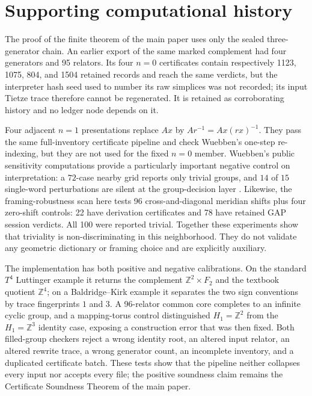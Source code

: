 \documentclass[11pt]{article}
\newcommand{\Z}{\mathbb{Z}}
\theoremstyle{definition}
\begin{document}
\section{Supporting computational history}\label{app:engineering}

The proof of the finite theorem of the main paper uses only the sealed three-generator
chain.  An earlier export of the same marked complement had four generators
and 95 relators.  Its four $n=0$ certificates contain respectively
1123, 1075, 804, and 1504 retained records and reach the same verdicts, but
the interpreter hash seed used to number its raw simplices was not recorded;
its input Tietze trace therefore cannot be regenerated.  It is retained as
corroborating history and no ledger node depends on it.

Four adjacent $n=1$ presentations replace $Ax$ by
$Ar^{-1}=Ax(rx)^{-1}$.  They pass the same full-inventory certificate
pipeline and check Wuebben's one-step re-indexing, but they are not used for
the fixed $n=0$ member.  Wuebben's public sensitivity computations provide a
particularly important negative control on interpretation: a $72$-case
nearby grid reports only trivial groups, and $14$ of $15$ single-word
perturbations are silent at the group-decision layer
\cite{WuebbenRepo}.  Likewise, the framing-robustness scan here tests 96
cross-and-diagonal meridian shifts plus four zero-shift controls: 22 have
derivation certificates and 78 have retained GAP session verdicts.  All 100
were reported trivial.  Together these experiments show that triviality is
non-discriminating in this neighborhood.  They do not validate any geometric
dictionary or framing choice and are explicitly auxiliary.

The implementation has both positive and negative calibrations.  On the
standard $T^4$ Luttinger example it returns the complement
$\Z^2\times F_2$ and the textbook quotient $\Z^4$; on a
Baldridge--Kirk example it separates the two sign conventions by trace
fingerprints $1$ and $3$.  A 96-relator common core completes to an infinite
cyclic group, and a mapping-torus control distinguished $H_1=\Z^2$ from the
$H_1=\Z^3$ identity case, exposing a construction error that was then fixed.
Both filled-group checkers reject a wrong identity root, an altered input
relator, an altered rewrite trace, a wrong generator count, an incomplete
inventory, and a duplicated certificate batch.  These tests show that the
pipeline neither collapses every input nor accepts every file; the positive
soundness claim remains the Certificate Soundness Theorem of the main paper.
\end{document}

